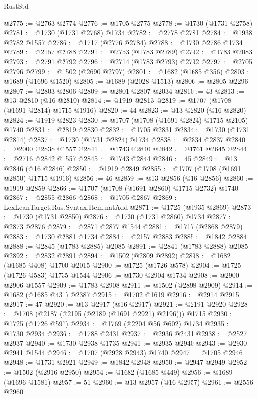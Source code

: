 \begin{lexlean}{RustStd}
\begin{coremodule}
@2775 := @2763 @2774
@2776 := @1705 @2775
@2778 := @1730 (@1731 @2758)
@2781 := @1730 (@1731 @2768) @1734
@2782 := @2778 @2781
@2784 := @1938 @2782 @1557
@2786 := @1717 (@2776 @2784)
@2788 := @1730 @2786 @1734
@2789 := @2157 @2788
@2791 := @2753 (@1783 @2789)
@2792 := @1783 @2083
@2793 := @2791 @2792
@2796 := @2714 (@1783 @2793) @2792
@2797 := @2705 @2796
@2799 := @1502 (@2690 @2797)
@2801 := @1682 (@1685 @356)
@2803 := @1689 (@1696 @1520)
@2805 := @1689 (@2028 @1513)
@2806 := @2805 @2296
@2807 := @2803 @2806
@2809 := @2801 @2807 @2034
@2810 := 43
@2813 := @13 @2810 (@16 @2810)
@2814 := @1919 @2813
@2819 := @1707 (@1708 (@1691 @2814) @1715 @1916)
@2820 := 44
@2823 := @13 @2820 (@16 @2820)
@2824 := @1919 @2823
@2830 := @1707 (@1708 (@1691 @2824) @1715 @2105) @1740
@2831 := @2819 @2830
@2832 := @1705 @2831
@2834 := @1730 (@1731 @2814)
@2837 := @1730 (@1731 @2824) @1734
@2838 := @2834 @2837
@2840 := @2000 @2838 @1557
@2841 := @1743 @2840
@2842 := @1761 @2645
@2844 := @2716 @2842 @1557
@2845 := @1743 @2844
@2846 := 45
@2849 := @13 @2846 (@16 @2846)
@2850 := @1919 @2849
@2855 := @1707 (@1708 (@1691 @2850) @1715 @1916)
@2856 := 46
@2859 := @13 @2856 (@16 @2856)
@2860 := @1919 @2859
@2866 := @1707 (@1708 (@1691 @2860) @1715 @2732) @1740
@2867 := @2855 @2866
@2868 := @1705 @2867
@2869 := LexLeanTarget.RustSyntax.Item.natAdd
@2871 := @1725 (@1935 @2869)
@2873 := @1730 (@1731 @2850)
@2876 := @1730 (@1731 @2860) @1734
@2877 := @2873 @2876
@2879 := @2871 @2877 @1544
@2881 := @1717 (@2868 @2879)
@2883 := @1730 @2881 @1734
@2884 := @2157 @2883
@2885 := @1842 @2884
@2888 := @2845 (@1783 @2885) @2085
@2891 := @2841 (@1783 @2888) @2085
@2892 := @2832 @2891
@2894 := @1502 (@2809 @2892)
@2898 := @1682 (@1685 @408) @1700 @2015
@2900 := @1725 (@1726 @578)
@2904 := @1725 (@1726 @583) @1735 @1544
@2906 := @1730 @2904 @1734
@2908 := @2900 @2906 @1557
@2909 := @1783 @2908
@2911 := @1502 (@2898 @2909)
@2914 := @1682 (@1685 @431) @2387
@2915 := @1702 @1619
@2916 := @2914 @2915
@2917 := 47
@2920 := @13 @2917 (@16 @2917)
@2921 := @2191 @2920
@2928 := @1708 (@2187 (@2195 (@2189 (@1691 @2921) @2196))) @1715
@2930 := @1725 (@1726 @597)
@2934 := @1769 (@2204 @56 @602) @1734
@2935 := @1730 @2934
@2936 := @1788 @2431
@2937 := @2936 @2431
@2938 := @2527 @2937
@2940 := @1730 @2938 @1735
@2941 := @2935 @2940
@2943 := @2930 @2941 @1544
@2946 := @1707 (@2928 @2943) @1740
@2947 := @1705 @2946
@2948 := @1731 @2921
@2949 := @1842 @2948
@2950 := @2947 @2949
@2952 := @1502 (@2916 @2950)
@2954 := @1682 (@1685 @449)
@2956 := @1689 (@1696 @1581)
@2957 := 51
@2960 := @13 @2957 (@16 @2957)
@2961 := @2556 @2960

\end{coremodule}
\end{lexlean}
